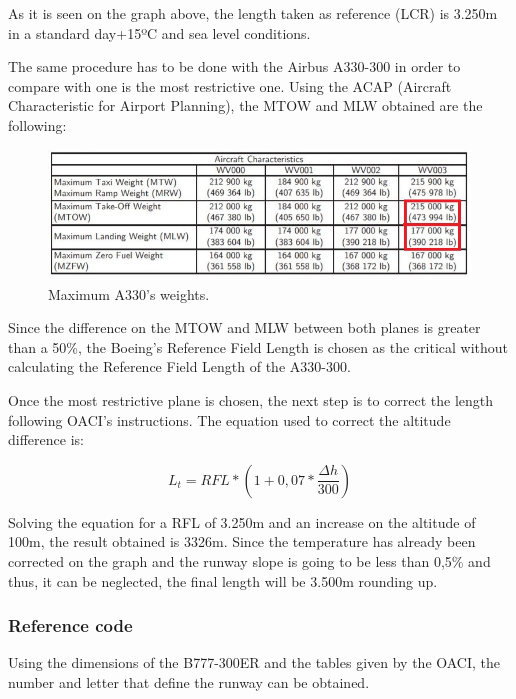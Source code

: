 			As it is seen on the graph above, the length taken as reference (LCR) is 3.250m in a standard day+15ºC and sea level conditions. 
			
			The same procedure has to be done with the Airbus A330-300 in order to compare with one is the most restrictive one. Using the ACAP (Aircraft Characteristic for Airport Planning), the MTOW and MLW obtained are the following:
			
			\begin{figure}[H]
				\centering
				\includegraphics[clip, trim=0cm 0cm 0cm 0cm, width=1\textwidth]{./images/A330/A330}
				\caption{Maximum A330's weights.} %
				\label{} %
			\end{figure}
			
			Since the difference on the MTOW and MLW between both planes is greater than a 50\%, the Boeing’s Reference Field Length is chosen as the critical without calculating the Reference Field Length of the A330-300.
			
			Once the most restrictive plane is chosen, the next step is to correct the length following OACI’s instructions. The equation used to correct the altitude difference is:
			
			\[L_t=RFL*(1+0,07*\frac{\Delta h}{300})\]
			
			Solving the equation for a RFL of 3.250m and an increase on the altitude of 100m, the result obtained is 3326m.
			Since the temperature has already been corrected on the graph and the runway slope is going to be less than 0,5\% and thus, it can be neglected, the final length will be 3.500m rounding up.
		
			\subsubsection{Reference code}
			Using the dimensions of the B777-300ER and the tables given by the OACI, the number and letter that define the runway can be obtained. 
			
